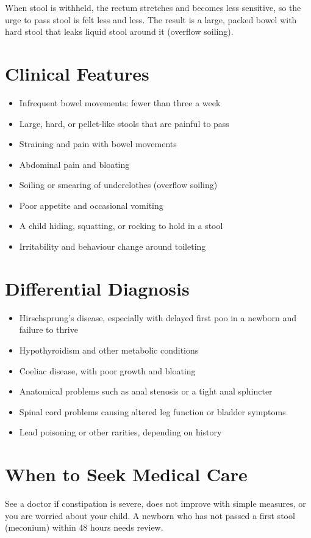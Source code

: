 When stool is withheld, the rectum stretches and becomes less sensitive, so the urge to pass stool is felt less and less. The result is a large, packed bowel with hard stool that leaks liquid stool around it (overflow soiling).

\section*{Clinical Features}
\begin{itemize}
    \item Infrequent bowel movements: fewer than three a week
    \item Large, hard, or pellet-like stools that are painful to pass
    \item Straining and pain with bowel movements
    \item Abdominal pain and bloating
    \item Soiling or smearing of underclothes (overflow soiling)
    \item Poor appetite and occasional vomiting
    \item A child hiding, squatting, or rocking to hold in a stool
    \item Irritability and behaviour change around toileting
\end{itemize}

\section*{Differential Diagnosis}
\begin{itemize}
    \item Hirschsprung's disease, especially with delayed first poo in a newborn and failure to thrive
    \item Hypothyroidism and other metabolic conditions
    \item Coeliac disease, with poor growth and bloating
    \item Anatomical problems such as anal stenosis or a tight anal sphincter
    \item Spinal cord problems causing altered leg function or bladder symptoms
    \item Lead poisoning or other rarities, depending on history
\end{itemize}

\section*{When to Seek Medical Care}
See a doctor if constipation is severe, does not improve with simple measures, or you are worried about your child. A newborn who has not passed a first stool (meconium) within 48 hours needs review.

